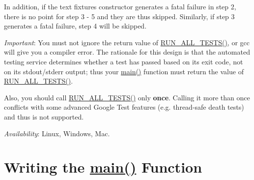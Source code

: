 In addition, if the text fixture\textquotesingle{}s constructor generates a fatal failure in step 2, there is no point for step 3 -\/ 5 and they are thus skipped. Similarly, if step 3 generates a fatal failure, step 4 will be skipped.

{\itshape Important}\+: You must not ignore the return value of {\ttfamily \hyperlink{gtest_8h_a853a3792807489591d3d4a2f2ff9359f}{R\+U\+N\+\_\+\+A\+L\+L\+\_\+\+T\+E\+S\+T\+S()}}, or {\ttfamily gcc} will give you a compiler error. The rationale for this design is that the automated testing service determines whether a test has passed based on its exit code, not on its stdout/stderr output; thus your {\ttfamily \hyperlink{odom__tracker__node_8cpp_a3c04138a5bfe5d72780bb7e82a18e627}{main()}} function must return the value of {\ttfamily \hyperlink{gtest_8h_a853a3792807489591d3d4a2f2ff9359f}{R\+U\+N\+\_\+\+A\+L\+L\+\_\+\+T\+E\+S\+T\+S()}}.

Also, you should call {\ttfamily \hyperlink{gtest_8h_a853a3792807489591d3d4a2f2ff9359f}{R\+U\+N\+\_\+\+A\+L\+L\+\_\+\+T\+E\+S\+T\+S()}} only {\bfseries once}. Calling it more than once conflicts with some advanced Google Test features (e.\+g. thread-\/safe death tests) and thus is not supported.

{\itshape Availability}\+: Linux, Windows, Mac.

\section*{Writing the \hyperlink{odom__tracker__node_8cpp_a3c04138a5bfe5d72780bb7e82a18e627}{main()} Function}

